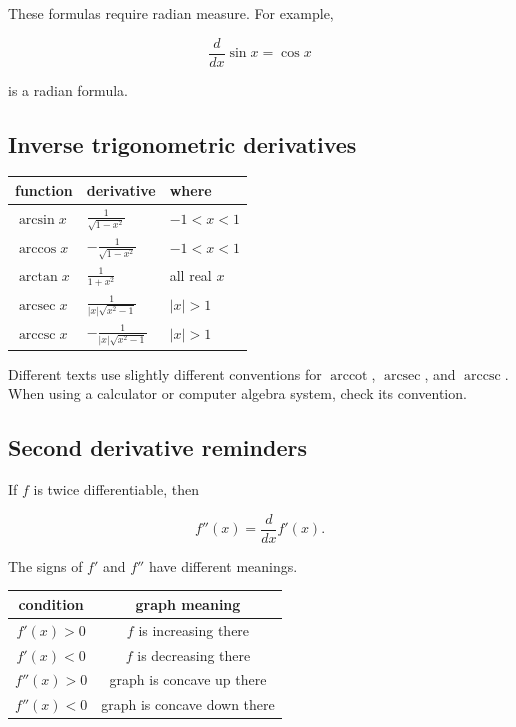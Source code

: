 These formulas require radian measure.  For example,

\[
\frac{d}{dx}\sin x=\cos x
\]

is a radian formula.

\subsection{Inverse trigonometric derivatives}
\label{appsubsec:inverse-trig-derivatives}

\begin{center}
\renewcommand{\arraystretch}{2.0}
\begin{tabular}{p{}|p{}|p{}}
\textbf{function} & \textbf{derivative} & \textbf{where} \\ \hline

\(\arcsin x\) &
\(\displaystyle \frac1{\sqrt{1-x^2}}\) &
\(-1<x<1\) \\

\(\arccos x\) &
\(\displaystyle -\frac1{\sqrt{1-x^2}}\) &
\(-1<x<1\) \\

\(\arctan x\) &
\(\displaystyle \frac1{1+x^2}\) &
all real \(x\) \\

\(\operatorname{arcsec} x\) &
\(\displaystyle \frac1{|x|\sqrt{x^2-1}}\) &
\(|x|>1\) \\

\(\operatorname{arccsc} x\) &
\(\displaystyle -\frac1{|x|\sqrt{x^2-1}}\) &
\(|x|>1\)
\end{tabular}
\end{center}

Different texts use slightly different conventions for \(\operatorname{arccot}\),
\(\operatorname{arcsec}\), and \(\operatorname{arccsc}\).  When using a calculator or
computer algebra system, check its convention.

\subsection{Second derivative reminders}
\label{appsubsec:second-derivative-reminders}

If \(f\) is twice differentiable, then

\[
f''(x)=\frac{d}{dx}f'(x).
\]

The signs of \(f'\) and \(f''\) have different meanings.

\begin{center}
\renewcommand{\arraystretch}{1.6}
\begin{tabular}{c|c}
\textbf{condition} & \textbf{graph meaning} \\ \hline
\(f'(x)>0\) & \(f\) is increasing there \\
\(f'(x)<0\) & \(f\) is decreasing there \\
\(f''(x)>0\) & graph is concave up there \\
\(f''(x)<0\) & graph is concave down there
\end{tabular}
\end{center}

